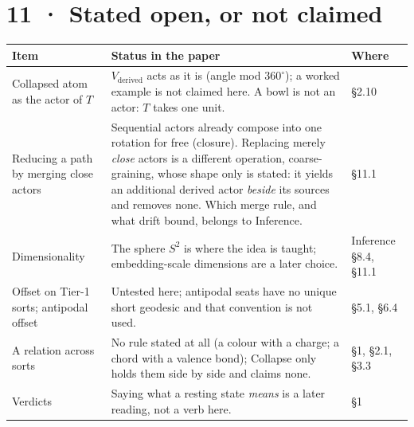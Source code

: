 \documentclass[10.5pt]{article}
\begin{document}
\section*{11 · Stated open, or not claimed}
{\small\setlength{\tabcolsep}{4pt}\begin{longtable}{L{4.0cm}L{10.4cm}L{1.9cm}}
\toprule
\textbf{Item} & \textbf{Status in the paper} & \textbf{Where} \\
\midrule
\endhead
Collapsed atom as the actor of $T$ & $V_{\text{derived}}$ acts as it is (angle mod $360^\circ$); a worked example is not claimed here. A bowl is not an actor: $T$ takes one unit. & §2.10 \\
Reducing a path by merging close actors & Sequential actors already compose into one rotation for free (closure). Replacing merely \emph{close} actors is a different operation, coarse-graining, whose shape only is stated: it yields an additional derived actor \emph{beside} its sources and removes none. Which merge rule, and what drift bound, belongs to Inference. & §11.1 \\
Dimensionality & The sphere $S^2$ is where the idea is taught; embedding-scale dimensions are a later choice. & Inference §8.4, §11.1 \\
Offset on Tier-1 sorts; antipodal offset & Untested here; antipodal seats have no unique short geodesic and that convention is not used. & §5.1, §6.4 \\
A relation across sorts & No rule stated at all (a colour with a charge; a chord with a valence bond); Collapse only holds them side by side and claims none. & §1, §2.1, §3.3 \\
Verdicts & Saying what a resting state \emph{means} is a later reading, not a verb here. & §1 \\
\bottomrule
\end{longtable}}
\end{document}
